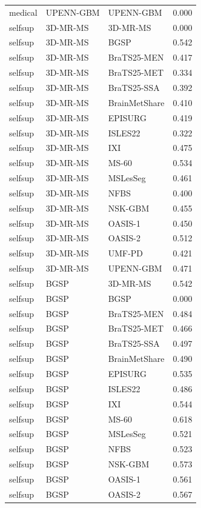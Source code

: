 \begin{tabular}{lllr}
medical & UPENN-GBM & UPENN-GBM & 0.000 \\
selfsup & 3D-MR-MS & 3D-MR-MS & 0.000 \\
selfsup & 3D-MR-MS & BGSP & 0.542 \\
selfsup & 3D-MR-MS & BraTS25-MEN & 0.417 \\
selfsup & 3D-MR-MS & BraTS25-MET & 0.334 \\
selfsup & 3D-MR-MS & BraTS25-SSA & 0.392 \\
selfsup & 3D-MR-MS & BrainMetShare & 0.410 \\
selfsup & 3D-MR-MS & EPISURG & 0.419 \\
selfsup & 3D-MR-MS & ISLES22 & 0.322 \\
selfsup & 3D-MR-MS & IXI & 0.475 \\
selfsup & 3D-MR-MS & MS-60 & 0.534 \\
selfsup & 3D-MR-MS & MSLesSeg & 0.461 \\
selfsup & 3D-MR-MS & NFBS & 0.400 \\
selfsup & 3D-MR-MS & NSK-GBM & 0.455 \\
selfsup & 3D-MR-MS & OASIS-1 & 0.450 \\
selfsup & 3D-MR-MS & OASIS-2 & 0.512 \\
selfsup & 3D-MR-MS & UMF-PD & 0.421 \\
selfsup & 3D-MR-MS & UPENN-GBM & 0.471 \\
selfsup & BGSP & 3D-MR-MS & 0.542 \\
selfsup & BGSP & BGSP & 0.000 \\
selfsup & BGSP & BraTS25-MEN & 0.484 \\
selfsup & BGSP & BraTS25-MET & 0.466 \\
selfsup & BGSP & BraTS25-SSA & 0.497 \\
selfsup & BGSP & BrainMetShare & 0.490 \\
selfsup & BGSP & EPISURG & 0.535 \\
selfsup & BGSP & ISLES22 & 0.486 \\
selfsup & BGSP & IXI & 0.544 \\
selfsup & BGSP & MS-60 & 0.618 \\
selfsup & BGSP & MSLesSeg & 0.521 \\
selfsup & BGSP & NFBS & 0.523 \\
selfsup & BGSP & NSK-GBM & 0.573 \\
selfsup & BGSP & OASIS-1 & 0.561 \\
selfsup & BGSP & OASIS-2 & 0.567 \\

\end{tabular}
